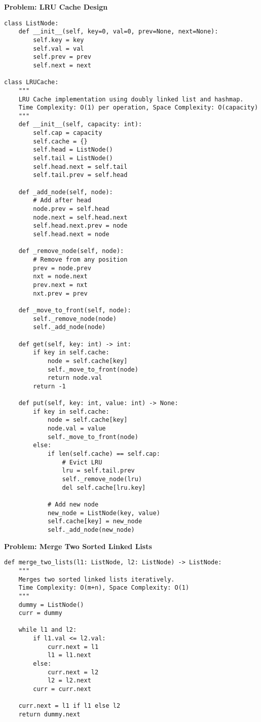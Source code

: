 \noindent\textbf{Problem: LRU Cache Design}
\begin{verbatim}
class ListNode:
    def __init__(self, key=0, val=0, prev=None, next=None):
        self.key = key
        self.val = val
        self.prev = prev
        self.next = next

class LRUCache:
    """
    LRU Cache implementation using doubly linked list and hashmap.
    Time Complexity: O(1) per operation, Space Complexity: O(capacity)
    """
    def __init__(self, capacity: int):
        self.cap = capacity
        self.cache = {}
        self.head = ListNode()
        self.tail = ListNode()
        self.head.next = self.tail
        self.tail.prev = self.head

    def _add_node(self, node):
        # Add after head
        node.prev = self.head
        node.next = self.head.next
        self.head.next.prev = node
        self.head.next = node

    def _remove_node(self, node):
        # Remove from any position
        prev = node.prev
        nxt = node.next
        prev.next = nxt
        nxt.prev = prev

    def _move_to_front(self, node):
        self._remove_node(node)
        self._add_node(node)

    def get(self, key: int) -> int:
        if key in self.cache:
            node = self.cache[key]
            self._move_to_front(node)
            return node.val
        return -1

    def put(self, key: int, value: int) -> None:
        if key in self.cache:
            node = self.cache[key]
            node.val = value
            self._move_to_front(node)
        else:
            if len(self.cache) == self.cap:
                # Evict LRU
                lru = self.tail.prev
                self._remove_node(lru)
                del self.cache[lru.key]
            
            # Add new node
            new_node = ListNode(key, value)
            self.cache[key] = new_node
            self._add_node(new_node)
\end{verbatim}

\noindent\textbf{Problem: Merge Two Sorted Linked Lists}
\begin{verbatim}
def merge_two_lists(l1: ListNode, l2: ListNode) -> ListNode:
    """
    Merges two sorted linked lists iteratively.
    Time Complexity: O(m+n), Space Complexity: O(1)
    """
    dummy = ListNode()
    curr = dummy
    
    while l1 and l2:
        if l1.val <= l2.val:
            curr.next = l1
            l1 = l1.next
        else:
            curr.next = l2
            l2 = l2.next
        curr = curr.next
    
    curr.next = l1 if l1 else l2
    return dummy.next
\end{verbatim}

